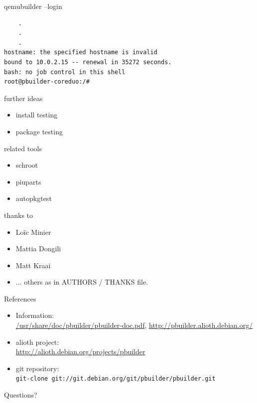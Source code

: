 \documentclass[dvipdfm,17pt,times]{beamer}
\newcommand{\emtext}[1]{
\begin{frame}{}
 
{\Huge #1
}
\end{frame}
}
\begin{document}
\begin{frame}[containsverbatim]{qemubuilder --login}
\begin{verbatim}
	.
	.
	.
hostname: the specified hostname is invalid
bound to 10.0.2.15 -- renewal in 35272 seconds.
bash: no job control in this shell
root@pbuilder-coreduo:/#
\end{verbatim}
\end{frame}



\begin{frame}{further ideas}
 \begin{itemize}
  \item install testing
  \item package testing
 \end{itemize}
\end{frame}

\begin{frame}{related tools}
 \begin{itemize}
  \item schroot
  \item piuparts
  \item autopkgtest
 \end{itemize}
\end{frame}

\begin{frame}{thanks to}
 \begin{itemize}
  \item Lo\"ic Minier
  \item Mattia Dongili
  \item Matt Kraai
  \item ... others as in AUTHORS / THANKS file.
 \end{itemize}
\end{frame}

\begin{frame}[containsverbatim]{References}
\begin{itemize}
 \item Information:\\
       \url{/usr/share/doc/pbuilder/pbuilder-doc.pdf}, 
       \url{http://pbuilder.alioth.debian.org/}

 \item alioth project:\\
{\scriptsize
\url{http://alioth.debian.org/projects/pbuilder}}

 \item git repository:\\
{\scriptsize
\texttt{git-clone git://git.debian.org/git/pbuilder/pbuilder.git}
}
\end{itemize}
\end{frame}


\emtext{Questions?}
\end{document}
